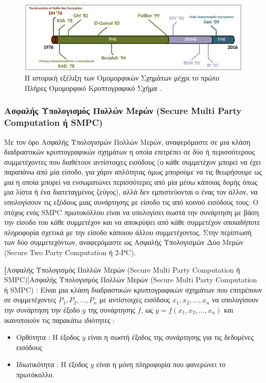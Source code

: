 \begin{figure}
    \centering
    \includegraphics[width=0.8\columnwidth]{./01_body/images/he_timeline.png}
    \caption{Η ιστορική εξέλιξη των Ομομορφικών Σχημάτων μέχρι το πρώτο Πλήρες Ομομορφικό Κρυπτογραφικό Σχήμα \cite{acar2018survey}.}
    \label{fig:he_timeline}
\end{figure}

\subsubsection[Ασφαλής Υπολογισμός Πολλών Μερών (Secure Multi Party Computation ή SMPC)]{Ασφαλής Υπολογισμός Πολλών Μερών (Secure Multi Party \\ Computation ή SMPC)}
Με τον όρο Ασφαλής Υπολογισμών Πολλών Μερών, αναφερόμαστε σε μια κλάση διαδραστικών κρυπτογραφικών σχημάτων η οποία επιτρέπει σε δύο ή περισσότερους συμμετέχοντες που διαθέτουν αντίστοιχες εισόδους (ο κάθε συμμετέχον μπορεί να έχει παραπάνω από μία είσοδο, για χάριν απλότητας όμως μπορούμε να τις θεωρήσουμε ως μια η οποία μπορεί να ενσωματώνει περισσότερες από μία μέσω κάποιας δομής όπως μια λίστα ή ένα διατεταγμένος ζεύγος), αλλά δεν εμπιστεύονται ο ένας τον άλλον, να υπολογίσουν τις εξόδους μιας συνάρτησης με είσοδο τις από κοινού εισόδους τους. Ο στόχος ενός SMPC πρωτοκόλλου είναι να υπολογίσει σωστά την συνάρτηση με βάση την είσοδο του κάθε συμμετέχον και να αποκρύψει από κάθε συμμετέχον οποιαδήποτε πληροφορία σχετικά με την είσοδο κάποιου άλλου συμμετέχοντος. Στην περίπτωσή των δύο συμμετεχόντων, αναφερόμαστε ως Ασφαλής Υπολογισμών Δύο Μερών (Secure Two Party Computation ή 2-PC).

\begin{definition}
\textbf[Ασφαλής Υπολογισμός Πολλών Μερών (Secure Multi Party Computation ή SMPC)]{Ασφαλής Υπολογισμός Πολλών Μερών (Secure Multi Party Computation ή SMPC)} : Είναι μια κλάση διαδραστικών κρυπτογραφικών σχημάτων που επιτρέπουν σε συμμετέχοντες $P_1, P_2, \dots, P_n$ με αντίστοιχες εισόδους $x_1, x_2, \dots, x_n$ να υπολογίσουν την συνάρτηση την έξοδο $y$ της συνάρτησης $f$, ως $y = f(x_1, x_2, \dots, x_n)$ και ικανοποιούν τις παρακάτω ιδιότητες :

\begin{itemize}
    \item Ορθότητα : Η έξοδος $y$ είναι η σωστή έξοδος της συνάρτησης για τις δεδομένες εισόδους
    \item Ιδιωτικότητα : Η έξοδος $y$ είναι η μόνη πληροφορία που φανερώνει το πρωτόκολλο.
\end{itemize}
\end{definition}

